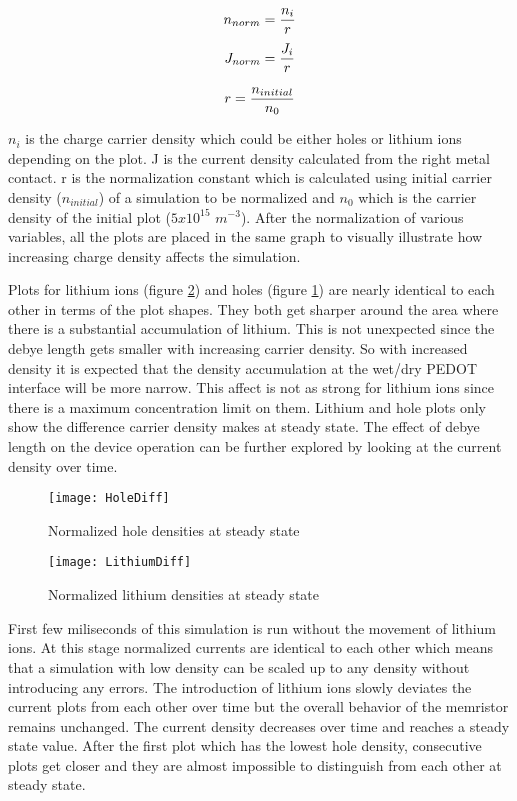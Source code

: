\begin{doublespace}
\begin{equation}
\centering
n_{norm}= \frac{n_i}{r} 
\end{equation}
\begin{equation}
\centering
J_{norm}= \frac{J_i}{r} 
\end{equation}

\begin{equation}
\centering
r = \frac{n_{initial}}{n_{0}}
\label{NormConst}
\end{equation}

$n_{i}$ is the charge carrier density which could be either holes or lithium ions depending on the plot. J is the current density calculated from the right metal contact. r is the normalization constant which is calculated using initial carrier density ($n_{initial}$) of a simulation to be normalized and $n_{0}$ which is the carrier density of the initial plot ($5 x 10^{15}$ $m^{-3}$). After the normalization of various variables, all the plots are placed in the same graph to visually illustrate how increasing charge density affects the simulation. 

Plots for lithium ions (figure \ref{LithiumDiff}) and holes (figure \ref{HoleDiff}) are nearly identical to each other in terms of the plot shapes. They both get sharper around the area where there is a substantial accumulation of lithium. This is not unexpected since the debye length gets smaller with increasing carrier density. So with increased density it is expected that the density accumulation at the wet/dry PEDOT interface will be more narrow. This affect is not as strong for lithium ions since there is a maximum concentration limit on them. Lithium and hole plots only show the difference carrier density makes at steady state. The effect of debye length on the device operation can be further explored by looking at the current density over time.   

\begin{figure}[!htp]
\centering
\texttt{[image: HoleDiff]}
\caption{Normalized hole densities at steady state} 
\label{HoleDiff}
\end{figure}

\begin{figure}[!htp]
\centering
\texttt{[image: LithiumDiff]}
\caption{Normalized lithium densities at steady state} 
\label{LithiumDiff}
\end{figure}

First few miliseconds of this simulation is run without the movement of lithium ions. At this stage normalized currents are identical to each other which means that a simulation with low density can be scaled up to any density without introducing any errors. The introduction of lithium ions slowly deviates the current plots from each other over time but the overall behavior of the memristor remains unchanged. The current density decreases over time and reaches a steady state value. After the first plot which has the lowest hole density, consecutive plots get closer and they are almost impossible to distinguish from each other at steady state.


\end{doublespace}
